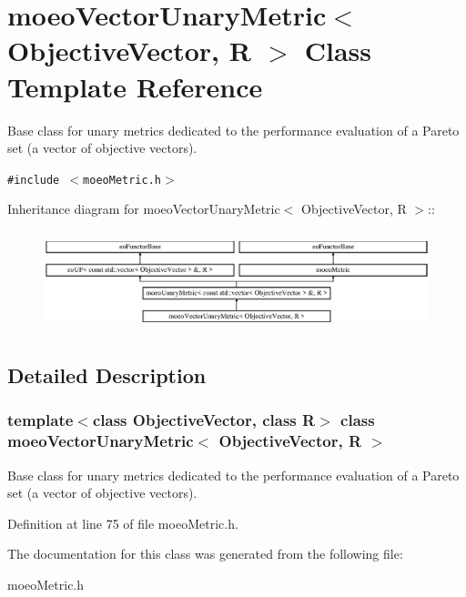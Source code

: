 \section{moeo\-Vector\-Unary\-Metric$<$ Objective\-Vector, R $>$ Class Template Reference}
\label{classmoeoVectorUnaryMetric}
Base class for unary metrics dedicated to the performance evaluation of a Pareto set (a vector of objective vectors).  


{\tt \#include $<$moeo\-Metric.h$>$}

Inheritance diagram for moeo\-Vector\-Unary\-Metric$<$ Objective\-Vector, R $>$::\begin{figure}[H]
\begin{center}
\leavevmode
\includegraphics[height=2.91667cm]{classmoeoVectorUnaryMetric}
\end{center}
\end{figure}


\subsection{Detailed Description}
\subsubsection*{template$<$class Objective\-Vector, class R$>$ class moeo\-Vector\-Unary\-Metric$<$ Objective\-Vector, R $>$}

Base class for unary metrics dedicated to the performance evaluation of a Pareto set (a vector of objective vectors). 



Definition at line 75 of file moeo\-Metric.h.

The documentation for this class was generated from the following file:\begin{CompactItemize}
\item 
moeo\-Metric.h\end{CompactItemize}
